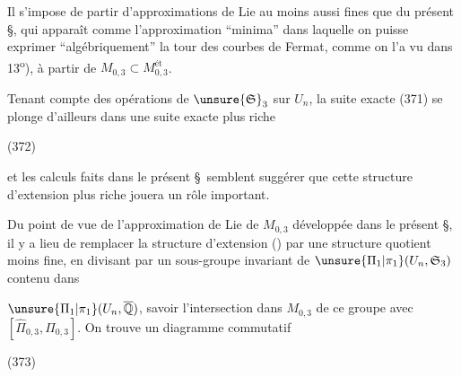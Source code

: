 Il s'impose de partir d'approximations de Lie au moins aussi fines que  du présent \S, qui apparaît comme l'approximation ``minima'' dans laquelle on puisse exprimer ``algébriquement'' la tour des courbes de Fermat,  comme on l'a vu dans 13\textsuperscript{o}), à partir de $M_{0,3}\subset M_{0,3}^{\text{ét}}$.

Tenant compte des opérations de $\unsure{\mathfrak S}_3$ sur $U_n$, la suite exacte (371) se plonge d'ailleurs dans une suite exacte plus riche

\noindent (372)

et les calculs faits dans le présent \S\ semblent suggérer que cette structure d'extension plus riche jouera un rôle important.

Du point de vue de l'approximation de Lie de $M_{0,3}$ développée dans le présent \S, il y a lieu de remplacer la structure d'extension () par une structure quotient moins fine, en divisant par un sous-groupe invariant de $\unsure{\Pi_1|\pi_1}(U_n,\mathfrak S_3)$ contenu dans

$\unsure{\Pi_1|\pi_1}(U_n,\overline{\mathbb Q})$, savoir l'intersection dans $M_{0,3}$ de ce groupe avec $[\widehat\Pi_{0,3},\widehat\Pi_{0,3}]$. On trouve un diagramme commutatif

\noindent (373)

